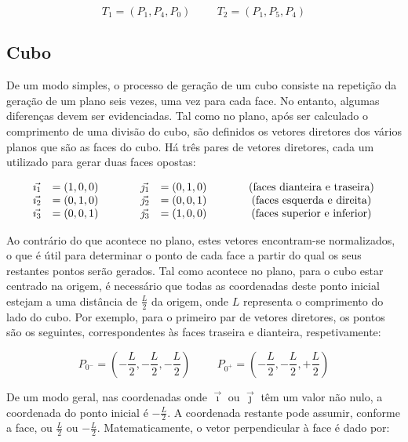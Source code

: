 \documentclass[12pt, a4paper]{article}
\begin{document}
$$
T_1 = (P_1, P_4, P_0)
\hspace{1cm}
T_2 = (P_1, P_5, P_4)
$$

\subsection{Cubo}

De um modo simples, o processo de geração de um cubo consiste na repetição da geração de um plano
seis vezes, uma vez para cada face. No entanto, algumas diferenças devem ser evidenciadas. Tal como
no plano, após ser calculado o comprimento de uma divisão do cubo, são definidos os vetores
diretores dos vários planos que são as faces do cubo. Há três pares de vetores diretores, cada um
utilizado para gerar duas faces opostas:

$$
\begin{array}{ll>{\hspace{1cm}}ll>{\hspace{1cm}}c}
    \vec{\imath_1} &= (1, 0, 0) &
    \vec{\jmath_1} &= (0, 1, 0) &
    (\text{faces dianteira e traseira}) \\
    \vec{\imath_2} &= (0, 1, 0) &
    \vec{\jmath_2} &= (0, 0, 1) &
    (\text{faces esquerda e direita}) \\
    \vec{\imath_3} &= (0, 0, 1) &
    \vec{\jmath_3} &= (1, 0, 0) &
    (\text{faces superior e inferior})
\end{array}
$$

Ao contrário do que acontece no plano, estes vetores encontram-se normalizados, o que é útil para
determinar o ponto de cada face a partir do qual os seus restantes pontos serão gerados. Tal como
acontece no plano, para o cubo estar centrado na origem, é necessário que todas as coordenadas deste
ponto inicial estejam a uma distância de $\frac{L}{2}$ da origem, onde $L$ representa o comprimento
do lado do cubo. Por exemplo, para o primeiro par de vetores diretores, os pontos são os seguintes,
correspondentes às faces traseira e dianteira, respetivamente:

$$
P_{0^-} = \left ( -\frac{L}{2}, -\frac{L}{2}, -\frac{L}{2} \right )
\hspace{1cm}
P_{0^+} = \left ( -\frac{L}{2}, -\frac{L}{2}, +\frac{L}{2} \right )
$$

De um modo geral, nas coordenadas onde $\vec{\imath}$ ou $\vec{\jmath}$ têm um valor não nulo, a
coordenada do ponto inicial é $-\frac{L}{2}$. A coordenada restante pode assumir, conforme a face,
ou $\frac{L}{2}$ ou $-\frac{L}{2}$. Matematicamente, o vetor perpendicular à face é dado por:
\end{document}
